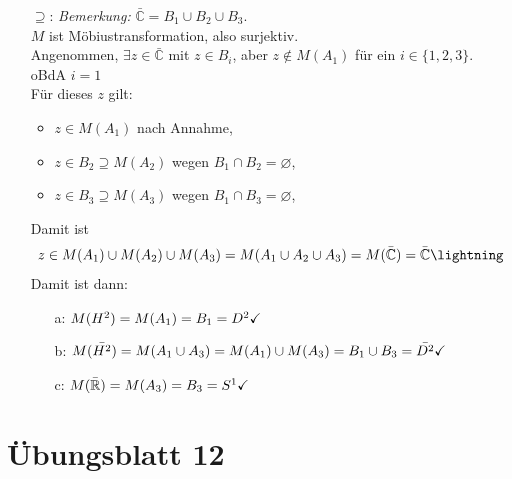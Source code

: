 \begin{problem}[4]
\begin{itemize}
    \item[\( \supseteq \):] \emph{Bemerkung:} \( \bar{\mathbb{C}} = B_1 \cup B_2 \cup B_3 \). \\
    \( M \) ist Möbiustransformation, also surjektiv. \\
    Angenommen, \( \exists z \in \bar{\mathbb{C}} \) mit \( z \in B_i \), aber \( z \notin M(A_1) \) für ein \( i \in \{ 1, 2, 3 \} \). \\
    oBdA \( i = 1 \) \\
    Für dieses \( z \) gilt:
    \begin{itemize}
      \item \( z \in M(A_1) \) nach Annahme,
      \item \( z \in B_2 \supseteq M(A_2) \) wegen \( B_1 \cap B_2 = \varnothing \),
      \item \( z \in B_3 \supseteq M(A_3) \) wegen \( B_1 \cap B_3 = \varnothing \),
    \end{itemize}
    Damit ist
    \begin{equation*}
      z \in M(A_1) \cup M(A_2) \cup M(A_3) = M(A_1 \cup A_2 \cup A_3) = M(\bar{\mathbb{C}}) = \bar{\mathbb{C}} \hfill \lightning
    \end{equation*}
    Damit ist dann:
    \begin{itemize}
      \item[a:] \( M(H^2) = M(A_1) = B_1 = D^2 \hfill \checkmark \)
      \item[b:] \( M(\bar{H^2}) = M(A_1 \cup A_3) = M(A_1) \cup M(A_3) = B_1 \cup B_3 = \bar{D^2} \hfill \checkmark \)
      \item[c:] \( M(\bar{ \mathbb{R}}) = M(A_3) = B_3 = S^1 \hfill \checkmark \)
    \end{itemize}
  \end{itemize}
\end{problem}



%
\section{Übungsblatt 12}

